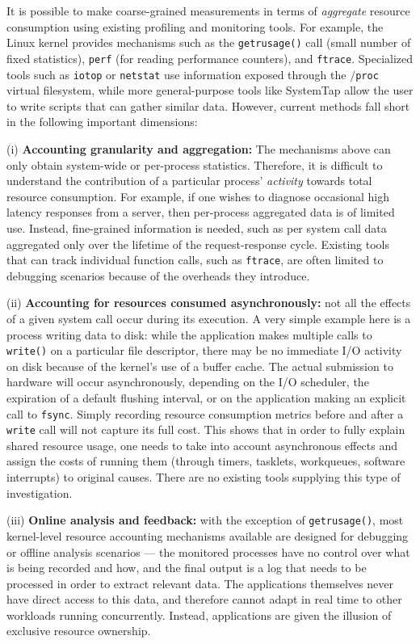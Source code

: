 \documentclass[letterpaper,twocolumn,10pt]{article}
\begin{document}
It is possible to make coarse-grained measurements in terms of
\textit{aggregate} resource consumption using existing profiling and monitoring
tools. For example, the Linux kernel provides mechanisms such as the \texttt{getrusage()} call
(small number of fixed statistics), \texttt{perf} (for reading performance
counters), and \texttt{ftrace}. Specialized tools such as \texttt{iotop} or
\texttt{netstat} use information exposed through the \texttt{$/$proc}
virtual filesystem, while more general-purpose tools like SystemTap allow the
user to write scripts that can gather similar data. However, current methods fall
short in the following important dimensions:

(i) \textbf{Accounting granularity and aggregation:} The mechanisms
above can only obtain system-wide or per-process statistics. Therefore, it is
difficult to understand the contribution of a particular process'
\textit{activity} towards total resource consumption. For example, if one
wishes to diagnose occasional high latency responses from a server, then
per-process aggregated data is of limited use. Instead, fine-grained information is
needed, such as per system call data aggregated only over the lifetime of the
request-response cycle. Existing tools that can track individual function calls,
such as \texttt{ftrace}, are often limited to debugging scenarios because of the overheads
they introduce.

(ii) \textbf{Accounting for resources consumed asynchronously:} not all the
effects of a given system call occur during its execution. A very simple example
here is a process writing data to disk: while the application makes multiple
calls to \texttt{write()} on a particular file descriptor, there may be no
immediate I/O activity on disk because of the kernel's use of a buffer cache. The
actual submission to hardware will occur asynchronously, depending on the I/O
scheduler, the expiration of a default flushing interval, or on the application
making an explicit call to \texttt{fsync}. Simply recording resource consumption
metrics before and after a \texttt{write} call will not capture its full cost.
This shows that in order to fully explain shared resource usage, one needs to
take into account asynchronous effects and assign the costs of running them
(through timers, tasklets, workqueues, software interrupts) to original causes.
There are no existing tools supplying this type of investigation.

(iii) \textbf{Online analysis and feedback:} with the exception of
\texttt{getrusage()}, most kernel-level resource accounting mechanisms available
are designed for debugging or offline analysis scenarios --- the monitored
processes have no control over what is being recorded and how, and the final
output is a log that needs to be processed in order to extract relevant data.
The applications themselves never have direct access to this data, and therefore
cannot adapt in real time to other workloads running concurrently. Instead,
applications are given the illusion of exclusive resource ownership.
\end{document}
